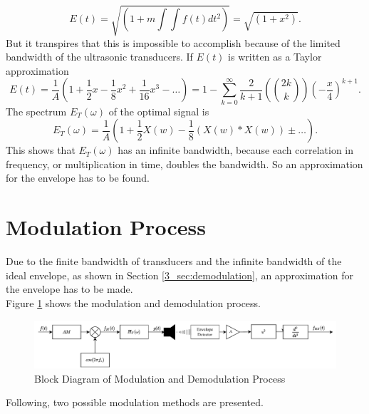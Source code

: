 \begin{equation}
    E(t) = \sqrt{\left ( 1 + m \int \int f(t)dt^2 \right )} =  \sqrt{\left ( 1 +x^2 \right )}.
\end{equation}
But it transpires that this is impossible to accomplish because of the limited bandwidth of the ultrasonic transducers.
If $E(t)$ is written as a Taylor approximation
\begin{equation}\label{3_eq:ideal_envelope}
    E(t) 
    = 
    \frac{1}{A} \left ( 1 + \frac{1}{2}x - \frac{1}{8}x^2 + \frac{1}{16}x^3 - \dots \right ) 
    =
    1 - \sum_{k=0}^\infty \frac{2}{k+1} \left ( \binom{2k}{k} \right) \left ( -\frac{x}{4}\right )^{k+1}.
\end{equation}
The spectrum $E_T(\omega)$ of the optimal signal is
\begin{equation}
    E_T(\omega) = \frac{1}{A} \left ( 1 + \frac{1}{2}X(w) - \frac{1}{8}\left (X(w) * X(w)\right ) \pm \dots \right ).
\end{equation}
This shows that $E_T(\omega)$ has an infinite bandwidth, because each correlation in frequency, or multiplication in time, doubles the bandwidth.
So an approximation for the envelope has to be found.
\newpage

\section{Modulation Process}\label{3_Parametric_array_Sec:Modulation}
Due to the finite bandwidth of transducers and the infinite bandwidth of the ideal envelope, as shown in Section \ref{3_sec:demodulation}, an approximation for the envelope has to be made.\\
Figure \ref{3_fig:block_diagram_modulation} shows the modulation and demodulation process.

\begin{figure}[h!]
    \centering
    \includegraphics[width=\textwidth]{images/3_Parametric_array/Modulation_Demodulation_Process.pdf}
    \caption{Block Diagram of Modulation and Demodulation Process}
    \label{3_fig:block_diagram_modulation}
\end{figure}

Following, two possible modulation methods are presented.  
